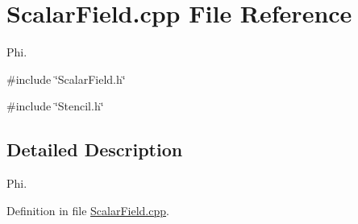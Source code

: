 \section{ScalarField.cpp File Reference}
\label{ScalarField_8cpp}


Phi.  


{\ttfamily \#include \char`\"{}ScalarField.h\char`\"{}}\par
{\ttfamily \#include \char`\"{}Stencil.h\char`\"{}}\par


\subsection{Detailed Description}
Phi. 

Definition in file \hyperlink{ScalarField_8cpp_source}{ScalarField.cpp}.

